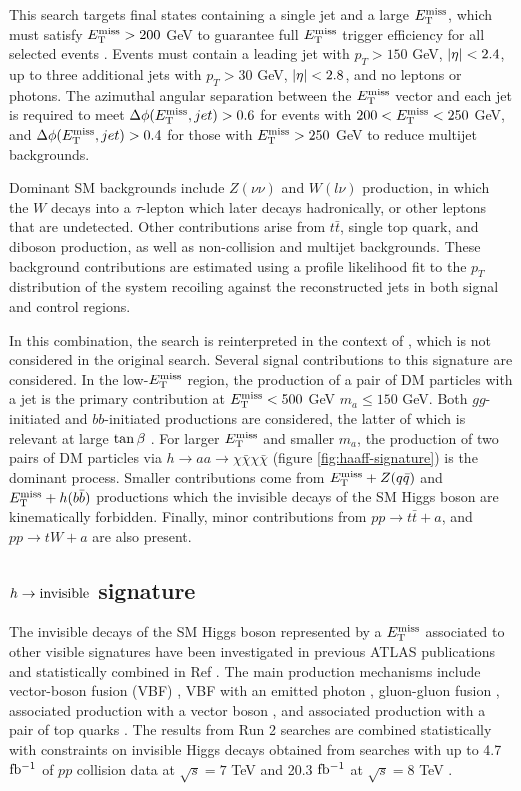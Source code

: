 This search targets final states containing a single jet and a large $E_{\mathrm{T}}^{\mathrm{miss}}$, which must satisfy $E_{\mathrm{T}}^{\mathrm{miss}}>200$ GeV to guarantee full $E_{\mathrm{T}}^{\mathrm{miss}}$ trigger efficiency for all selected events \cite{EXOT-2018-06}. Events must contain a leading jet with $p_T>150$ GeV, $\abs{\eta} < 2.4$, up to three additional jets with $p_T>30$ GeV, $\abs{\eta} < 2.8$, and no leptons or photons. The azimuthal angular separation between the $E_{\mathrm{T}}^{\mathrm{miss}}$ vector and each jet is required to meet $\Delta\phi(E_{\mathrm{T}}^{\mathrm{miss}}, jet) > 0.6$ for events with $200 < E_{\mathrm{T}}^{\mathrm{miss}} < 250$ GeV, and $\Delta\phi(E_{\mathrm{T}}^{\mathrm{miss}}, jet) > 0.4$ for those with $E_{\mathrm{T}}^{\mathrm{miss}} > 250$ GeV to reduce multijet backgrounds. 

Dominant SM backgrounds include $Z(\nu\nu)$ and $W(l\nu)$ production, in which the $W$ decays into a $\tau$-lepton which later decays hadronically, or other leptons that are undetected. Other contributions arise from $t\bar{t}$, single top quark, and diboson production, as well as non-collision and multijet backgrounds. These background contributions are estimated using a profile likelihood fit to the $p_T$ distribution of the system recoiling against the reconstructed jets in both signal and control regions.

In this combination, the search is reinterpreted in the context of \hdma, which is not considered in the original search. Several signal contributions to this signature are considered. In the low-$E_{\mathrm{T}}^{\mathrm{miss}}$ region, the production of a pair of DM particles with a jet is the primary contribution at $E_{\mathrm{T}}^{\mathrm{miss}}< 500$ GeV $m_a\le 150$ GeV. Both $gg$-initiated and $bb$-initiated productions are considered, the latter of which is relevant at large $\tan\beta~$. For larger $E_{\mathrm{T}}^{\mathrm{miss}}$ and smaller $m_a$, the production of two pairs of DM particles via $h\rightarrow aa \rightarrow \chi\bar{\chi}\chi\bar{\chi}$ (figure \ref{fig:haaff-signature}) is the dominant process. Smaller contributions come from $E_{\mathrm{T}}^{\mathrm{miss}}+Z(q\bar{q})$ and $E_{\mathrm{T}}^{\mathrm{miss}} + h(b\bar{b})$ productions which the invisible decays of the SM Higgs boson are kinematically forbidden. Finally, minor contributions from $pp\rightarrow t\bar{t} +a$, and $pp\rightarrow tW+a$ are also present.

\subsection{\texorpdfstring{$h\rightarrow \mathrm{invisible}$}{TEXT} signature}

The invisible decays of the SM Higgs boson represented by a $E_{\mathrm{T}}^{\mathrm{miss}}$ associated to other visible signatures have been investigated in previous ATLAS publications and statistically combined in Ref \cite{HIGG-2021-05}. The main production mechanisms include vector-boson fusion (VBF) \cite{EXOT-2020-11}, VBF with an emitted photon \cite{EXOT-2021-17}, gluon-gluon fusion \cite{EXOT-2018-06}, associated production with a vector boson \cite{HIGG-2018-26}, and associated production with a pair of top quarks \cite{SUSY-2019-12}. The results from Run 2 searches are combined statistically with constraints on invisible Higgs decays obtained from searches with up to 4.7 $\mbox{fb\(^{-1}\)}$ of $pp$ collision data at $\sqrt{s}=7$ TeV and 20.3 $\mbox{fb\(^{-1}\)}$ at $\sqrt{s}=8$ TeV \cite{HIGG-2015-03}. 

